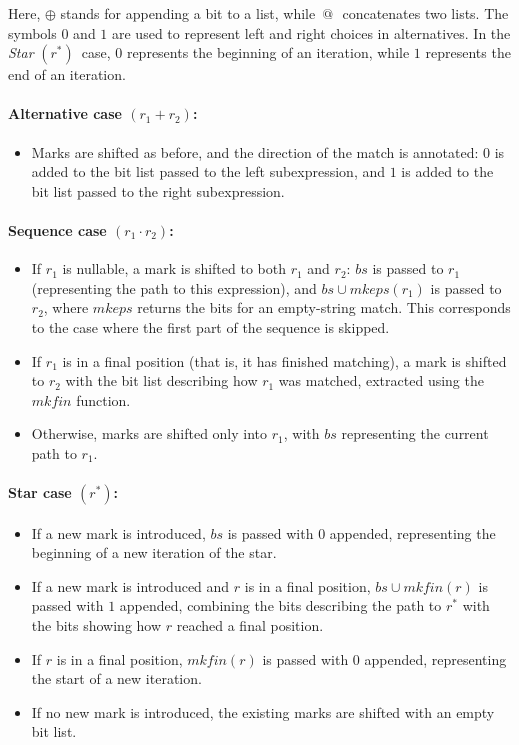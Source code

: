\documentclass[12pt]{article}
\makeatletter
\newcommand{\mkeps}{\textit{mkeps}}
\newcommand{\mkfin}{\textit{mkfin}}
\newcommand{\STARText}{\textit{Star} $(r^*)$}
\newcommand{\At}{$\,@\,$}
\makeatother
\begin{document}
Here, $\oplus$ stands for appending a bit to a list, while \At\, concatenates two lists.  
The symbols $0$ and $1$ are used to represent left and right choices in alternatives.  
In the \STARText\ case, $0$ represents the beginning of an iteration, while $1$ represents the end of an iteration.

\paragraph*{\textbf{Alternative case} $(r_1 + r_2)$:}

\begin{itemize}
  \item Marks are shifted as before, and the direction of the match is annotated:  
  $0$ is added to the bit list passed to the left subexpression,  
  and $1$ is added to the bit list passed to the right subexpression.
\end{itemize}

\paragraph*{\textbf{Sequence case} $(r_1 \cdot r_2)$:}
\begin{itemize}
    \item If $r_1$ is nullable, a mark is shifted to both $r_1$ and $r_2$:  
    $bs$ is passed to $r_1$ (representing the path to this expression),  
    and $bs \cup \mkeps(r_1)$ is passed to $r_2$, where $\mkeps$ returns the bits for an empty-string match.  
    This corresponds to the case where the first part of the sequence is skipped.  
    \item If $r_1$ is in a final position (that is, it has finished matching),  
    a mark is shifted to $r_2$ with the bit list describing how $r_1$ was matched,  
    extracted using the $\mkfin$ function.  
    \item Otherwise, marks are shifted only into $r_1$, with $bs$ representing the current path to $r_1$.  
\end{itemize}

\paragraph*{\textbf{Star case} $(r^*)$:}
\begin{itemize}
    \item If a new mark is introduced, $bs$ is passed with $0$ appended,  
    representing the beginning of a new iteration of the star.  
    \item If a new mark is introduced and $r$ is in a final position,  
    $bs \cup \mkfin(r)$ is passed with $1$ appended, combining the bits describing the path to $r^*$  
    with the bits showing how $r$ reached a final position.  
    \item If $r$ is in a final position, $\mkfin(r)$ is passed with $0$ appended,  
    representing the start of a new iteration.  
    \item If no new mark is introduced, the existing marks are shifted with an empty bit list.  
\end{itemize}
\end{document}
